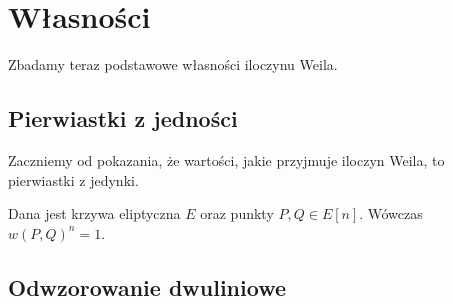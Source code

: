 \section{Własności}

Zbadamy teraz podstawowe własności iloczynu Weila.

\subsection*{Pierwiastki z jedności}

Zaczniemy od pokazania, że wartości, jakie przyjmuje iloczyn Weila,
to pierwiastki z jedynki.

\begin{theorem}
Dana jest krzywa eliptyczna $E$ oraz punkty $P, Q \in E[n]$.
Wówczas $w(P,Q)^n = 1$.
\end{theorem}


\subsection*{Odwzorowanie dwuliniowe}

